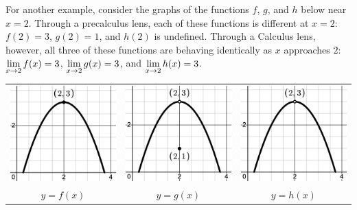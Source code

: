 \medskip

For another example, consider the graphs of the functions $f$, $g$, and $h$ below near $x = 2$. Through a precalculus lens, each of these functions is different at $x = 2$:   $f(2) = 3$, $g(2) = 1$, and $h(2)$ is undefined.  Through a Calculus lens, however, all three of these functions are behaving identically as  $x$ approaches $2$:   $\displaystyle{\lim_{x \rightarrow 2} f(x) = 3}$, $\displaystyle{ \lim_{x \rightarrow 2} g(x)= 3}$, and $\displaystyle{\lim_{x \rightarrow 2} h(x) = 3}$.


\begin{center}

\begin{tabular}{ccc}

 \includegraphics[width=2in]{./IntroLimitsGraphics/limitgrapha.png} &  \includegraphics[width=2in]{./IntroLimitsGraphics/limitgraphc.png} &  \includegraphics[width=2in]{./IntroLimitsGraphics/limitgraphb.png} \\
 
 $y = f(x)$ & $y = g(x)$ & $y = h(x)$ \\
 
 \end{tabular}
 
 \end{center}
 

